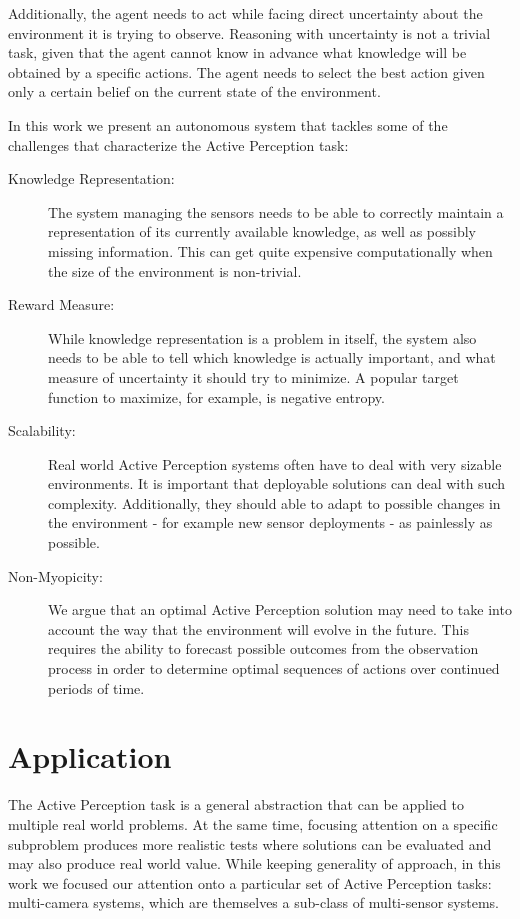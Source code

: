 Additionally, the agent needs to act while facing direct uncertainty about the environment it is
trying to observe. Reasoning with uncertainty is not a trivial task, given that the agent cannot
know in advance what knowledge will be obtained by a specific actions. The agent needs to select the
best action given only a certain belief on the current state of the environment.

In this work we present an autonomous system that tackles some of the challenges that characterize
the Active Perception task:

\begin{description}
\item[Knowledge Representation:] The system managing the sensors needs to be able to correctly
    maintain a representation of its currently available knowledge, as well as possibly missing
    information. This can get quite expensive computationally when the size of the environment is
    non-trivial.
\item[Reward Measure:] While knowledge representation is a problem in itself, the system also needs
    to be able to tell which knowledge is actually important, and what measure of uncertainty it
    should try to minimize. A popular target function to maximize, for example, is negative entropy.
\item[Scalability:] Real world Active Perception systems often have to deal with very sizable
    environments. It is important that deployable solutions can deal with such complexity.
    Additionally, they should able to adapt to possible changes in the environment - for example new
    sensor deployments - as painlessly as possible.
\item[Non-Myopicity:] We argue that an optimal Active Perception solution may need to take into
    account the way that the environment will evolve in the future. This requires the ability to
    forecast possible outcomes from the observation process in order to determine optimal sequences
    of actions over continued periods of time.
\end{description}

\section{Application}

The Active Perception task is a general abstraction that can be applied to multiple real world
problems. At the same time, focusing attention on a specific subproblem produces more realistic
tests where solutions can be evaluated and may also produce real world value. While keeping
generality of approach, in this work we focused our attention onto a particular set of Active
Perception tasks: multi-camera systems, which are themselves a sub-class of multi-sensor systems.

